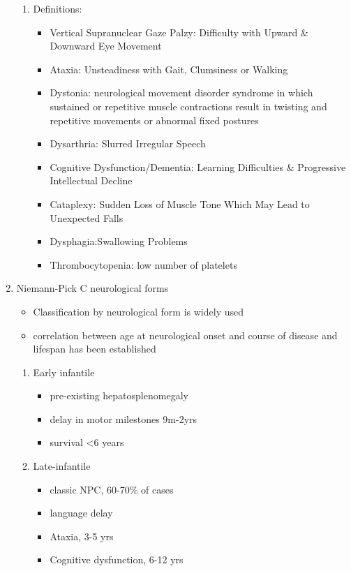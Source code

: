 \documentclass{scrartcl}
\begin{document}
\begin{enumerate}
\begin{enumerate}
\item Definitions:
\label{sec:org36cdfd6}
\begin{itemize}
\item Vertical Supranuclear Gaze Palzy: Difficulty with Upward \& Downward Eye Movement
\item Ataxia: Unsteadiness with Gait, Clumsiness or Walking
\item Dystonia:  neurological movement disorder syndrome in which sustained or repetitive muscle contractions result in twisting and repetitive movements or abnormal fixed postures
\item Dysarthria: Slurred Irregular Speech
\item Cognitive Dysfunction/Dementia: Learning Difficulties \& Progressive Intellectual Decline
\item Cataplexy: Sudden Loss of Muscle Tone Which May Lead to Unexpected Falls
\item Dysphagia:Swallowing Problems
\item Thrombocytopenia: low number of platelets
\end{itemize}
\end{enumerate}

\item Niemann-Pick C neurological forms
\label{sec:org7a5c5eb}

\small
\begin{itemize}
\item Classification by neurological form is widely used
\item correlation between age at neurological onset and course of disease
and lifespan has been established
\end{itemize}

\begin{enumerate}
\item Early infantile
\label{sec:org14257fb}
\begin{itemize}
\item pre-existing hepatosplenomegaly
\item delay in motor milestones 9m-2yrs
\item survival <6 years
\end{itemize}

\item Late-infantile
\label{sec:org2f89d0b}
\begin{itemize}
\item classic NPC, 60-70\% of cases
\item language delay
\item Ataxia, 3-5 yrs
\item Cognitive dysfunction, 6-12 yrs
\end{itemize}


\end{enumerate}
\end{enumerate}
\end{document}

